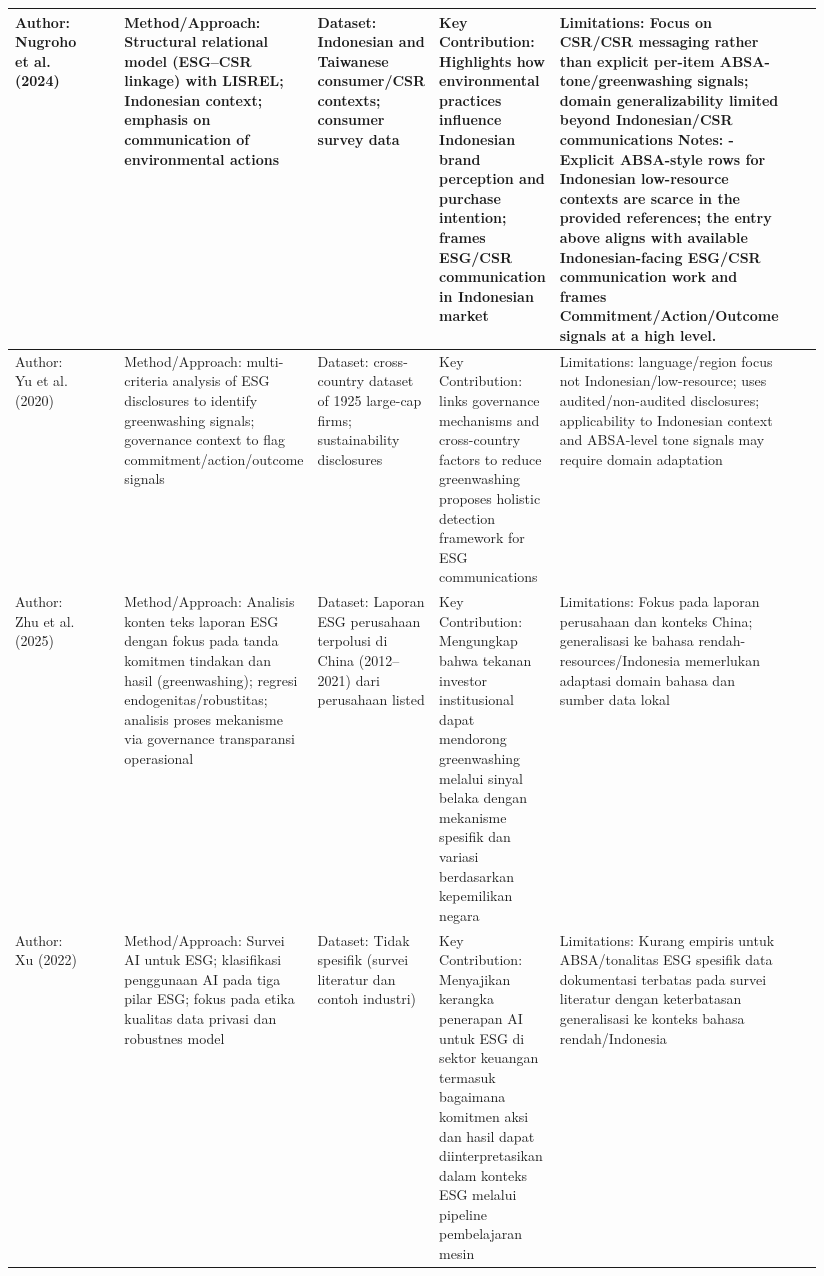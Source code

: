 \documentclass{article}
\begin{document}
\begin{landscape}
\begin{longtable}{p{0.134\linewidth} p{0.134\linewidth} p{0.134\linewidth} p{0.134\linewidth} p{0.134\linewidth} p{0.134\linewidth} p{0.134\linewidth}}
Author: Nugroho et al. (2024) & ~ & Method/Approach: Structural relational model (ESG–CSR linkage) with LISREL; Indonesian context; emphasis on communication of environmental actions & Dataset: Indonesian and Taiwanese consumer/CSR contexts; consumer survey data & Key Contribution: Highlights how environmental practices influence Indonesian brand perception and purchase intention; frames ESG/CSR communication in Indonesian market & Limitations: Focus on CSR/CSR messaging rather than explicit per-item ABSA-tone/greenwashing signals; domain generalizability limited beyond Indonesian/CSR communications Notes: - Explicit ABSA-style rows for Indonesian low-resource contexts are scarce in the provided references; the entry above aligns with available Indonesian-facing ESG/CSR communication work and frames Commitment/Action/Outcome signals at a high level. & ~ \\ \hline
Author: Yu et al. (2020) & ~ & Method/Approach: multi-criteria analysis of ESG disclosures to identify greenwashing signals; governance context to flag commitment/action/outcome signals & Dataset: cross-country dataset of 1925 large-cap firms; sustainability disclosures & Key Contribution: links governance mechanisms and cross-country factors to reduce greenwashing proposes holistic detection framework for ESG communications & Limitations: language/region focus not Indonesian/low-resource; uses audited/non-audited disclosures; applicability to Indonesian context and ABSA-level tone signals may require domain adaptation & ~ \\ \hline
Author: Zhu et al. (2025) & ~ & Method/Approach: Analisis konten teks laporan ESG dengan fokus pada tanda komitmen tindakan dan hasil (greenwashing); regresi endogenitas/robustitas; analisis proses mekanisme via governance transparansi operasional & Dataset: Laporan ESG perusahaan terpolusi di China (2012–2021) dari perusahaan listed & Key Contribution: Mengungkap bahwa tekanan investor institusional dapat mendorong greenwashing melalui sinyal belaka dengan mekanisme spesifik dan variasi berdasarkan kepemilikan negara & Limitations: Fokus pada laporan perusahaan dan konteks China; generalisasi ke bahasa rendah-resources/Indonesia memerlukan adaptasi domain bahasa dan sumber data lokal & ~ \\ \hline
Author: Xu (2022) & ~ & Method/Approach: Survei AI untuk ESG; klasifikasi penggunaan AI pada tiga pilar ESG; fokus pada etika kualitas data privasi dan robustnes model & Dataset: Tidak spesifik (survei literatur dan contoh industri) & Key Contribution: Menyajikan kerangka penerapan AI untuk ESG di sektor keuangan termasuk bagaimana komitmen aksi dan hasil dapat diinterpretasikan dalam konteks ESG melalui pipeline pembelajaran mesin & Limitations: Kurang empiris untuk ABSA/tonalitas ESG spesifik data dokumentasi terbatas pada survei literatur dengan keterbatasan generalisasi ke konteks bahasa rendah/Indonesia & ~ \\ \hline

\end{longtable}
\end{landscape}
\end{document}
